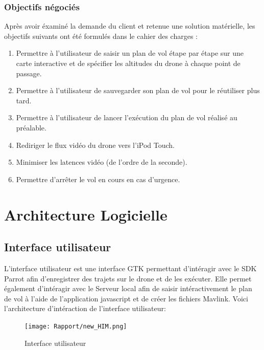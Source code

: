 \documentclass{article}
\begin{document}
    \subsubsection{Objectifs négociés}
    Après avoir éxaminé la demande du client et retenue une solution matérielle, les objectifs suivants ont été formulés dans le cahier des charges :
		\vspace{0.1cm}
	\begin{enumerate}
        	\item Permettre à l'utilisateur de saisir un plan de vol étape par étape sur une carte interactive et de spécifier les altitudes du drone à chaque point de passage.
        	\item Permettre à l'utilisateur de sauvegarder son plan de vol pour le réutiliser plus tard.
			\item Permettre à l'utilisateur de lancer l'exécution du plan de vol réalisé au préalable.
		 	\item Rediriger le flux vidéo du drone vers l'iPod Touch. 
		 	\item Minimiser les latences vidéo (de l'ordre de la seconde).
		 	\item Permettre d'arrêter le vol en cours en cas d'urgence.
    \end{enumerate}
        
    
        
	

		
	\newpage
\section{Architecture Logicielle}
    \subsection{Interface utilisateur}
    L'interface utilisateur est une interface GTK permettant d'intéragir avec le SDK Parrot afin d'enregistrer des trajets sur le drone et de les exécuter.
    \newline
    Elle permet également d'intéragir avec le Serveur local afin de saisir intéractivement le plan de vol à l'aide de l'application javascript et de créer les fichiers Mavlink.
    \vspace{0.2cm}
    \newline
    Voici l'architecture d'intéraction de l'interface utilisateur:
        \vspace*{0.5cm}
        \begin{center}
		\begin{figure}[!h]
		\texttt{[image: Rapport/new\_HIM.png]}\\
		 \vspace*{0.3cm}
		\caption{Interface utilisateur}
		\end{figure}
        \end{center}
\end{document}
